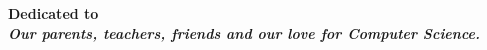 \chapter*{ }
\label{dedication}
\thispagestyle{empty}
\begin{center}
\Huge\bf  Dedicated to\\
\Huge \em Our parents, teachers, friends and our love for Computer Science.\\[20ex]
\end{center}
